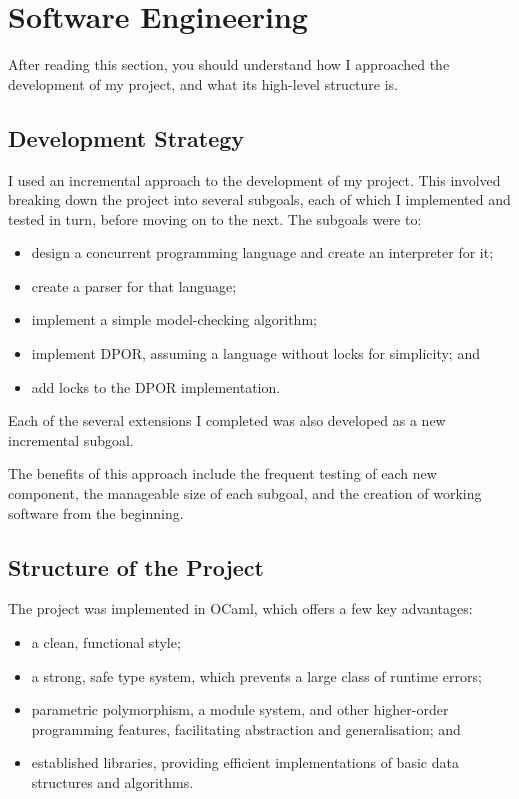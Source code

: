 \documentclass[12pt,a4paper,twoside,openany]{report}
\begin{document}
\section{Software Engineering}
After reading this section, you should
understand how I approached the
development of my project, and what its high-level
structure is.

\subsection{Development Strategy}
I used an
incremental approach to the
development of my project.
This involved breaking down 
the project into several
subgoals, each of which I implemented
and tested in turn, before moving on to the next.
The subgoals were
to:
\begin{itemize}
	\item design a concurrent programming
	language and create an interpreter for it;
	\item create a parser for that language;
	\item implement a simple model-checking
	algorithm;
	\item implement DPOR, assuming
	a language without locks for simplicity; and
	\item add locks to the DPOR implementation.
\end{itemize}
Each of the several extensions I completed
was also developed as a new incremental subgoal.

The benefits of this approach include the frequent
testing of each new component, the manageable
size of each subgoal, and the creation of
working software from the beginning.

\subsection{Structure of the Project}
The project was implemented in OCaml, which
offers a few key advantages:
\begin{itemize}
	\item a clean, functional
	style;
	\item a strong, safe type system, which prevents
	a large class of runtime errors;
	\item parametric polymorphism, a module system,
	and other higher-order programming features,
	facilitating abstraction and generalisation; and
	\item established libraries, providing efficient
	implementations of basic data structures and algorithms.
\end{itemize}
\end{document}
